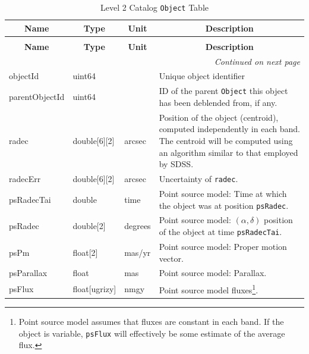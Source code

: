 \documentclass[12pt]{article}
\newcommand{\code}[1]{\texttt{#1}}
\newcommand{\Object}{\code{Object}\xspace}
\begin{document}
\begin{center}
\begin{longtable}{p{3cm}p{2cm}p{2cm}p{5cm}}
\caption[\Object Table]{Level 2 Catalog \Object Table\label{tbl:objectTable}
} \\

\hline \multicolumn{1}{c}{\bf Name} & \multicolumn{1}{c}{\bf Type} & \multicolumn{1}{c}{\bf Unit} & \multicolumn{1}{c}{\bf Description} \\ \hline
\endfirsthead

\caption[\Object Table]{Level 2 Catalog \Object Table}\\

\hline \multicolumn{1}{c}{\bf Name} & \multicolumn{1}{c}{\bf Type} & \multicolumn{1}{c}{\bf Unit} & \multicolumn{1}{c}{\bf Description} \\ \hline
 \endhead
\endhead

\hline \multicolumn{4}{r}{{\em Continued on next page}} \\
\endfoot

\hline\hline
\endlastfoot

objectId & uint64 & ~ & Unique object identifier \\

parentObjectId & uint64 & ~ & ID of the parent \Object this object has been deblended from, if any. \\

radec & double[6][2] & arcsec & Position of the object (centroid), computed independently in each band.
The centroid will be computed using an algorithm similar to that employed by SDSS.\\

radecErr & double[6][2] & arcsec & Uncertainty of {\tt radec}. \\

psRadecTai & double & time & Point source model: Time at which the object was at position {\tt psRadec}. \\

psRadec & double[2] & degrees & Point source model: $(\alpha, \delta)$ position of the object at time {\tt psRadecTai}. \\

psPm & float[2] & mas/yr & Point source model: Proper motion vector.\\

psParallax & float & mas & Point source model: Parallax. \\

psFlux & float[ugrizy] & nmgy & Point source model fluxes\footnote{Point source model assumes that fluxes are constant in each band. If the object is variable, {\tt psFlux} will effectively be some estimate of the average flux.}.\\


\end{longtable}
\end{center}
\end{document}
